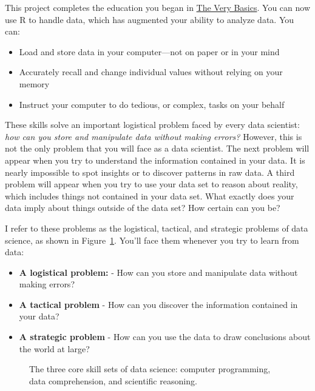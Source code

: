 \documentclass[
  letterpaper,
  DIV=11,
  numbers=noendperiod]{scrbook}
\makeatletter
\newcommand*\pandocbounded[1]{%
  \sbox\pandoc@box{#1}%
  \Gscale@div\@tempa{\textheight}{\dimexpr\ht\pandoc@box+\dp\pandoc@box\relax}%
  \Gscale@div\@tempb{\linewidth}{\wd\pandoc@box}%
  \ifdim\@tempb\p@<\@tempa\p@\let\@tempa\@tempb\fi%
  \ifdim\@tempa\p@<\p@\scalebox{\@tempa}{\usebox\pandoc@box}%
  \else\usebox{\pandoc@box}%
  \fi%
}
\providecommand{\tightlist}{%
  \setlength{\itemsep}{0pt}\setlength{\parskip}{0pt}}
\makeatother
\begin{document}
This project completes the education you began in
\hyperref[sec-basics]{The Very Basics}. You can now use R to handle
data, which has augmented your ability to analyze data. You can:

\begin{itemize}
\tightlist
\item
  Load and store data in your computer---not on paper or in your mind
\item
  Accurately recall and change individual values without relying on your
  memory
\item
  Instruct your computer to do tedious, or complex, tasks on your behalf
\end{itemize}

These skills solve an important logistical problem faced by every data
scientist: \emph{how can you store and manipulate data without making
errors?} However, this is not the only problem that you will face as a
data scientist. The next problem will appear when you try to understand
the information contained in your data. It is nearly impossible to spot
insights or to discover patterns in raw data. A third problem will
appear when you try to use your data set to reason about reality, which
includes things not contained in your data set. What exactly does your
data imply about things outside of the data set? How certain can you be?

I refer to these problems as the logistical, tactical, and strategic
problems of data science, as shown in Figure~\ref{fig-venn}. You'll face
them whenever you try to learn from data:

\begin{itemize}
\tightlist
\item
  \textbf{A logistical problem:} - How can you store and manipulate data
  without making errors?
\item
  \textbf{A tactical problem} - How can you discover the information
  contained in your data?
\item
  \textbf{A strategic problem} - How can you use the data to draw
  conclusions about the world at large?
\end{itemize}

\begin{figure}

\centering{

\pandocbounded{\texttt{[image: images/hopr\_1004.png]}}

}

\caption{\label{fig-venn}The three core skill sets of data science:
computer programming, data comprehension, and scientific reasoning.}

\end{figure}%
\end{document}
